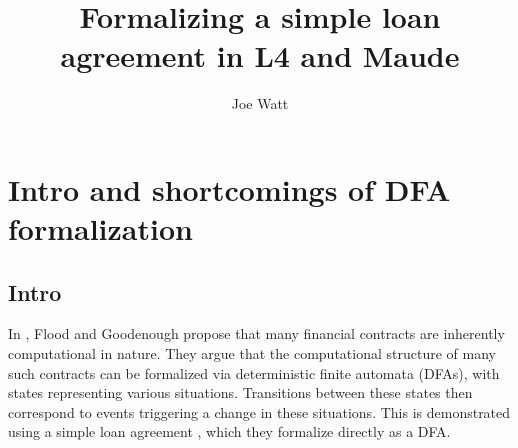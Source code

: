 \documentclass{article}
\title{Formalizing a simple loan agreement in L4 and Maude}
\author{Joe Watt}
\begin{document}
\maketitle


\tableofcontents

\newpage

\section{Intro and shortcomings of DFA formalization}

\subsection{Intro}



In \cite{contract_as_automaton}, Flood and Goodenough propose that many
financial contracts are inherently computational in nature.
They argue that the computational structure of many such contracts can be
formalized via deterministic finite automata (DFAs), with states representing
various situations.
Transitions between these states then correspond to events triggering a change
in these situations.
This is demonstrated using a simple loan agreement \cite{contract_as_automaton},
which they formalize directly as a DFA.
\end{document}
